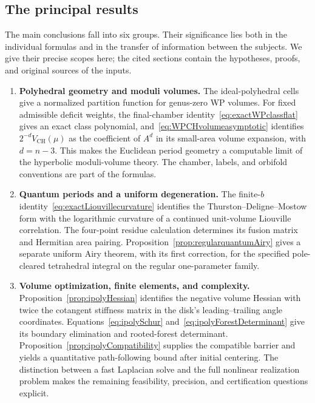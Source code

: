 \documentclass[11pt,a4paper]{article}
\numberwithin{equation}{section}
\theoremstyle{definition}
\theoremstyle{remark}
\begin{document}
\subsection*{The principal results}

The main conclusions fall into six groups. Their significance lies both
in the individual formulas and in the transfer of information between
the subjects. We give their precise scopes here; the cited sections
contain the hypotheses, proofs, and original sources of the inputs.

\begin{enumerate}[leftmargin=*,label=\textbf{\arabic*.}]
\item \textbf{Polyhedral geometry and moduli volumes.}
The ideal-polyhedral cells give a normalized partition function for
genus-zero WP volumes. For fixed admissible deficit weights, the
final-chamber identity~\eqref{eq:exactWPclassflat} gives an exact class
polynomial, and~\eqref{eq:WPCHvolumeasymptotic} identifies
$2^{-d}V_{\mathrm{CH}}(\mu)$ as the coefficient of $A^d$ in its
small-area volume expansion, with $d=n-3$. This makes
the Euclidean period geometry a computable limit of the hyperbolic
moduli-volume theory. The chamber, labels, and orbifold conventions are
part of the formulas.

\item \textbf{Quantum periods and a uniform degeneration.}
The finite-$b$ identity~\eqref{eq:exactLiouvillecurvature} identifies the
Thurston--Deligne--Mostow form with the logarithmic curvature of a
continued unit-volume Liouville correlation. The four-point residue
calculation determines its fusion matrix and Hermitian area pairing.
Proposition~\ref{prop:regularquantumAiry} gives a separate uniform
Airy theorem, with its first correction, for the specified pole-cleared
tetrahedral integral on the regular one-parameter family.

\item \textbf{Volume optimization, finite elements, and complexity.}
Proposition~\ref{prop:ipolyHessian} identifies the negative volume
Hessian with twice the cotangent stiffness matrix in the disk's
leading--trailing angle coordinates. Equations~\eqref{eq:ipolySchur}
and~\eqref{eq:ipolyForestDeterminant} give its boundary elimination and
rooted-forest determinant. Proposition~\ref{prop:ipolyCompatibility}
supplies the compatible barrier and yields a quantitative path-following
bound after initial centering. The distinction between a fast Laplacian
solve and the full nonlinear realization problem makes the remaining
feasibility, precision, and certification questions explicit.


\end{enumerate}
\end{document}
